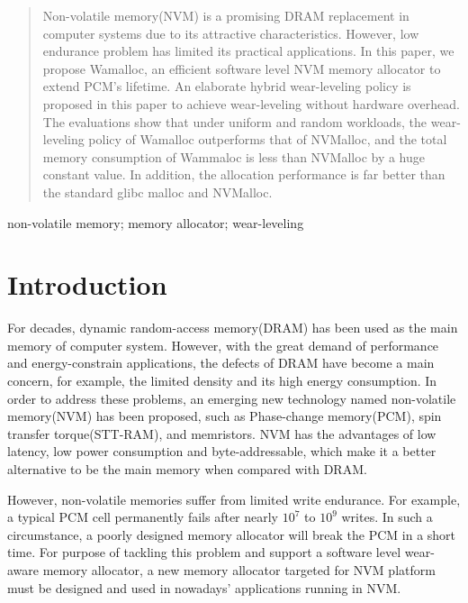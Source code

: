 \documentclass[10pt, conference, compsocconf]{IEEEtran}
\begin{document}
\begin{abstract}
Non-volatile memory(NVM) is a promising DRAM replacement in computer systems due to its attractive characteristics.
However, low endurance problem has limited its practical applications.
In this paper, we propose Wamalloc, an efficient software level NVM memory allocator to extend PCM's lifetime.
An elaborate hybrid wear-leveling policy is proposed in this paper to achieve wear-leveling without hardware overhead.
The evaluations show that under uniform and random workloads,
the wear-leveling policy of Wamalloc outperforms that of NVMalloc,
and the total memory consumption of Wammaloc is less than NVMalloc by a huge constant value.
In addition, the allocation performance is far better than the standard glibc malloc and NVMalloc.

\end{abstract}

\begin{IEEEkeywords}
non-volatile memory; memory allocator; wear-leveling

\end{IEEEkeywords}

\section{Introduction}

For decades, dynamic random-access memory(DRAM) has been used as the main memory of computer system.
However, with the great demand of performance and energy-constrain applications, the defects of DRAM have become a main concern,
for example, the limited density\cite{mandelman2002challenges}
and its high energy consumption\cite{lefurgy2003energy}. 
In order to address these problems, an emerging new technology named non-volatile memory(NVM) has been proposed, 
such as Phase-change memory(PCM)\cite{huang2009phase},
spin transfer torque(STT-RAM)\cite{apalkov2013spin}, and memristors\cite{ho2009nonvolatile}. 
NVM has the advantages of low latency, low power consumption and byte-addressable,
which make it a better alternative to be the main memory when compared with DRAM.

However, non-volatile memories suffer from limited write endurance. 
For example, a typical PCM cell permanently fails after nearly $10^7$ to $10^9$ writes. 
In such a circumstance, a poorly designed memory allocator will break the PCM in a short time. 
For purpose of tackling this problem and support a software level wear-aware memory allocator,
a new memory allocator targeted for NVM platform must be designed and used in nowadays’ applications running in NVM.
\end{document}

